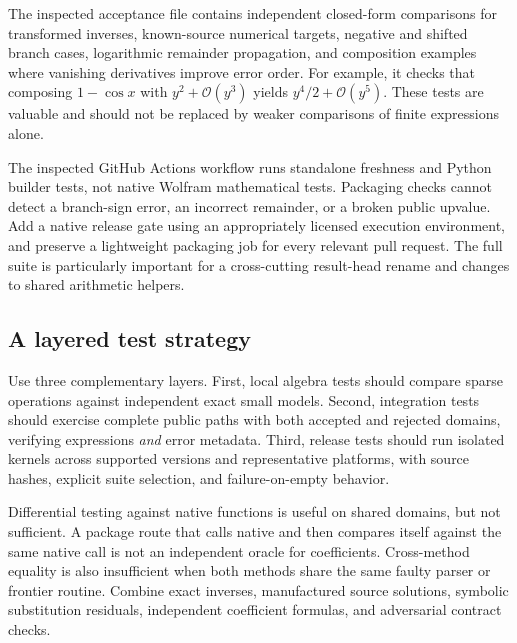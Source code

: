 \documentclass[11pt,a4paper]{article}
\newcommand{\OO}{\mathcal O}
\newcommand{\code}[1]{\texttt{\detokenize{#1}}}
\begin{document}
The inspected acceptance file contains independent closed-form comparisons for transformed inverses, known-source numerical targets, negative and shifted branch cases, logarithmic remainder propagation, and composition examples where vanishing derivatives improve error order. For example, it checks that composing $1-\cos x$ with $y^2+\OO(y^3)$ yields $y^4/2+\OO(y^5)$. These tests are valuable and should not be replaced by weaker comparisons of finite expressions alone.\cite{acceptance}

The inspected GitHub Actions workflow runs standalone freshness and Python builder tests, not native Wolfram mathematical tests. Packaging checks cannot detect a branch-sign error, an incorrect remainder, or a broken public upvalue. Add a native release gate using an appropriately licensed execution environment, and preserve a lightweight packaging job for every relevant pull request. The full suite is particularly important for a cross-cutting result-head rename and changes to shared arithmetic helpers.\cite{workflow,validation}

\subsection{A layered test strategy}

Use three complementary layers. First, local algebra tests should compare sparse operations against independent exact small models. Second, integration tests should exercise complete public paths with both accepted and rejected domains, verifying expressions \emph{and} error metadata. Third, release tests should run isolated kernels across supported versions and representative platforms, with source hashes, explicit suite selection, and failure-on-empty behavior.

Differential testing against native functions is useful on shared domains, but not sufficient. A package route that calls native \code{Series} and then compares itself against the same native \code{Series} call is not an independent oracle for coefficients. Cross-method equality is also insufficient when both methods share the same faulty parser or frontier routine. Combine exact inverses, manufactured source solutions, symbolic substitution residuals, independent coefficient formulas, and adversarial contract checks.
\end{document}
